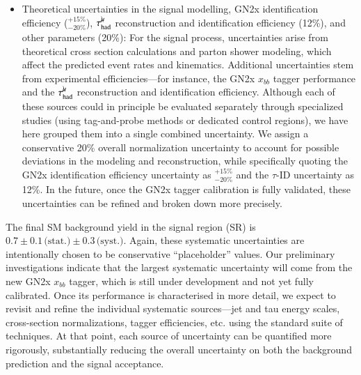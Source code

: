 \begin{itemize}
        \item Theoretical uncertainties in the signal modelling, GN2x identification efficiency (\( {}^{+15\%}_{-20\%} \)), 
            \(\tau_\mathrm{had}^{\mu\mkern-10mu\backslash}\) reconstruction and identification efficiency (12\%), and other parameters (20\%):
            For the signal process, uncertainties arise from theoretical cross section calculations and parton shower 
            modeling, which affect the predicted event rates and kinematics. Additional uncertainties stem from 
            experimental efficiencies—for instance, the GN2x \( x_{bb} \) tagger performance and the 
            \(\tau_\mathrm{had}^{\mu\mkern-10mu\backslash}\) reconstruction and identification efficiency. Although each of these sources 
            could in principle be evaluated separately through specialized studies (using tag-and-probe methods or dedicated control regions), 
            we have here grouped them into a single combined uncertainty. 
            We assign a conservative 20\% overall normalization uncertainty to account for possible deviations 
            in the modeling and reconstruction, while specifically quoting the GN2x identification efficiency 
            uncertainty as \( {}^{+15\%}_{-20\%} \) and the \(\tau\)-ID uncertainty as 12\%. In the future, 
            once the GN2x tagger calibration is fully validated, these uncertainties can be refined and broken down more precisely.
    \end{itemize}
    The final SM background yield in the signal region (SR) is \( 0.7 \pm 0.1 \,\text{(stat.)} \pm 0.3 \,\text{(syst.)}\). 
    Again, these systematic uncertainties are intentionally chosen to be conservative “placeholder” values. 
    Our preliminary investigations indicate that the largest systematic uncertainty will come from 
    the new GN2x \(x_{bb}\) tagger, which is still under development and not yet fully calibrated. 
    Once its performance is characterised in more detail, we expect to revisit and refine the 
    individual systematic sources---jet and tau energy scales, cross-section normalizations, tagger efficiencies, etc. 
    using the standard suite of techniques. 
    At that point, each source of uncertainty can be quantified more rigorously, substantially reducing 
    the overall uncertainty on both the background prediction and the signal acceptance.

